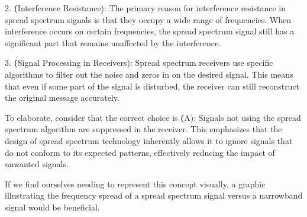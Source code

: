 2. \textbf(Interference Resistance): The primary reason for interference resistance in spread spectrum signals is that they occupy a wide range of frequencies. When interference occurs on certain frequencies, the spread spectrum signal still has a significant part that remains unaffected by the interference.

3. \textbf(Signal Processing in Receivers): Spread spectrum receivers use specific algorithms to filter out the noise and zeros in on the desired signal. This means that even if some part of the signal is disturbed, the receiver can still reconstruct the original message accurately.

To elaborate, consider that the correct choice is \textbf(A): Signals not using the spread spectrum algorithm are suppressed in the receiver. This emphasizes that the design of spread spectrum technology inherently allows it to ignore signals that do not conform to its expected patterns, effectively reducing the impact of unwanted signals.

If we find ourselves needing to represent this concept visually, a graphic illustrating the frequency spread of a spread spectrum signal versus a narrowband signal would be beneficial. 

